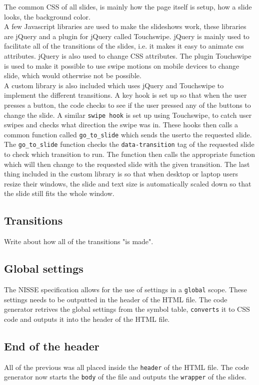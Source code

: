 The common CSS of all slides, is mainly how the page itself is setup, how a slide looks, the background color.\\

A few Javascript libraries are used to make the slideshows work, these libraries are jQuery and a plugin for jQuery called Touchswipe. jQuery is mainly used to facilitate all of the transitions of the slides, i.e. it makes it easy to animate css attributes. jQuery is also used to change CSS attributes. The plugin Touchswipe is used to make it possible to use swipe motions on mobile devices to change slide, which would otherwise not be possible. \\

A custom library is also included which uses jQuery and Touchswipe to implement the different transitions. A key hook is set up so that when the user presses a button, the code checks to see if the user pressed any of the buttons to change the slide. A similar \texttt{swipe hook} is set up using Touchswipe, to catch user swipes and checks what direction the swipe was in. These hooks then calls a common function called \texttt{go\_to\_slide} which sends the userto the requested slide. The \texttt{go\_to\_slide} function checks the \texttt{data-transition} tag of the requested slide to check which transition to run. The function then calls the appropriate function which will then change to the requested slide with the given transition. The last thing included in the custom library is so that when desktop or laptop users resize their windows, the slide and text size is automatically scaled down so that the slide still fits the whole window.\\

\subsection{Transitions}
Write about how all of the transitions "is made".

\subsection{Global settings}
The NISSE specification allows for the use of settings in a \texttt{global} scope. These settings needs to be outputted in the header of the HTML file. The code generator retrives the global settings from the symbol table, \texttt{converts} it to CSS code and outputs it into the header of the HTML file.

\subsection{End of the header}
All of the previous was all placed inside the \texttt{header} of the HTML file. The code generator now starts the \texttt{body} of the file and outputs the \texttt{wrapper} of the slides.

